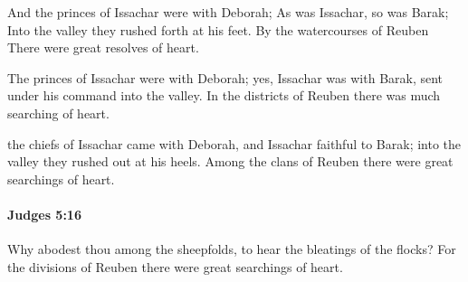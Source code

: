 			\begin{versebox}
					\item[BHS] 
					\item[ASV] And the princes of Issachar were with Deborah; As was Issachar, so was Barak; Into the valley they rushed forth at his feet. By the watercourses of Reuben There were great resolves of heart.
					\item[NIV] The princes of Issachar were with Deborah; yes, Issachar was with Barak, sent under his command into the valley. In the districts of Reuben there was much searching of heart.
					\item[NRSV] the chiefs of Issachar came with Deborah, and Issachar faithful to Barak; into the valley they rushed out at his heels. Among the clans of Reuben there were great searchings of heart.
			\end{versebox}

		\paragraph{Judges 5:16} %
			\label{JUDGES-5-16}

			Why abodest thou among the sheepfolds, to hear the bleatings of the flocks? For the divisions of Reuben there were great searchings of heart.

